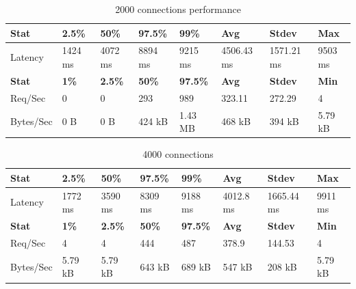 \documentclass[../Main.tex]{subfiles}
\begin{document}
\begin{table}[H]
  \centering
  \begin{tabular}{|l|l|l|l|l|l|l|l|}
    \hline
    \rowcolor[HTML]{f56b00}
    \textbf{Stat} & \textbf{2.5\%} & \textbf{50\%} & \textbf{97.5\%} & \textbf{99\%} & \textbf{Avg} & \textbf{Stdev} & \textbf{Max} \\
    \hline
    Latency & 1424 ms & 4072 ms & 8894 ms & 9215 ms & 4506.43 ms & 1571.21 ms & 9503 ms \\
    \hline
    \rowcolor[HTML]{f56b00}
    \textbf{Stat} & \textbf{1\%} & \textbf{2.5\%} & \textbf{50\%} & \textbf{97.5\%} & \textbf{Avg} & \textbf{Stdev} & \textbf{Min} \\
    \hline
    Req/Sec & 0 & 0 & 293 & 989 & 323.11 & 272.29 & 4 \\
    Bytes/Sec & 0 B & 0 B & 424 kB & 1.43 MB & 468 kB & 394 kB & 5.79 kB \\
    \hline
  \end{tabular}
  \caption{2000 connections performance}
  \label{2000-connections-performance}
\end{table}

\begin{table}[H]
  \centering
  \begin{tabular}{|l|l|l|l|l|l|l|l|}
    \hline
    \rowcolor[HTML]{f56b00}
    \textbf{Stat} & \textbf{2.5\%} & \textbf{50\%} & \textbf{97.5\%} & \textbf{99\%} & \textbf{Avg} & \textbf{Stdev} & \textbf{Max} \\
    \hline
    Latency & 1772 ms & 3590 ms & 8309 ms & 9188 ms & 4012.8 ms & 1665.44 ms & 9911 ms \\
    \hline
    \rowcolor[HTML]{f56b00}
    \textbf{Stat} & \textbf{1\%} & \textbf{2.5\%} & \textbf{50\%} & \textbf{97.5\%} & \textbf{Avg} & \textbf{Stdev} & \textbf{Min} \\
    \hline
    Req/Sec & 4 & 4 & 444 & 487 & 378.9 & 144.53 & 4 \\
    Bytes/Sec & 5.79 kB & 5.79 kB & 643 kB & 689 kB & 547 kB & 208 kB & 5.79 kB \\
    \hline
  \end{tabular}
  \caption{4000 connections}
  \label{4000-connections-performance}
\end{table}
\end{document}
